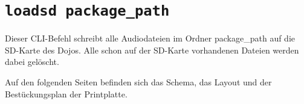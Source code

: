 \section*{\texttt{loadsd package\_path}}
Dieser CLI-Befehl schreibt alle Audiodateien im Ordner package\_path auf die SD-Karte des Dojos. Alle schon auf der SD-Karte vorhandenen Dateien werden dabei gelöscht.

\newpage
Auf den folgenden Seiten befinden sich das Schema, das Layout und der Bestückungsplan der Printplatte.


\label{pdf:SchemaSpannungsversorgung}


\label{pdf:SchemaUSB}


\label{pdf:SchemaMikrocontroller}


\label{pdf:BestueckungTop}


\label{pdf:BestueckungBottom}


\label{pdf:LayoutAll}


\label{pdf:LayoutTop}


\label{pdf:LayoutBottom}

